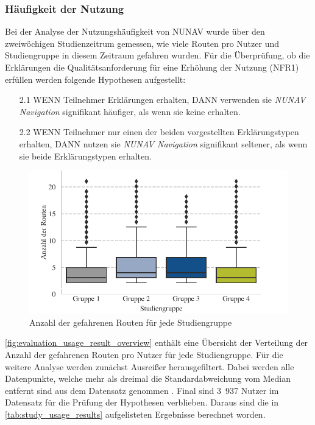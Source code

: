 \subsubsection{Häufigkeit der Nutzung}
\label{sec:06_model_evaluation:usage_analysis}

Bei der Analyse der Nutzungshäufigkeit von NUNAV wurde über den zweiwöchigen Studienzeitrum gemessen, wie viele Routen pro Nutzer und Studiengruppe in diesem Zeitraum gefahren wurden. Für die Überprüfung, ob die Erklärungen die Qualitätsanforderung für eine Erhöhung der Nutzung (NFR1) erfüllen werden folgende Hypothesen aufgestellt:

\begin{enumerate}
    \item[2.1] WENN Teilnehmer Erklärungen erhalten, DANN verwenden sie \textit{NUNAV Navigation} signifikant häufiger, als wenn sie keine erhalten.
    \item[2.2] WENN Teilnehmer nur einen der beiden vorgestellten Erklärungstypen erhalten, DANN nutzen sie \textit{NUNAV Navigation} signifikant seltener, als wenn sie beide Erklärungstypen erhalten.
\end{enumerate}

\begin{figure}[b!]
    \centering
    \includegraphics[width=\textwidth]{contents/06_model_evaluation/02_evaluation/res/usage_result_overview.pdf}
    \caption{Anzahl der gefahrenen Routen für jede Studiengruppe}
    \label{fig:evaluation_usage_result_overview}
\end{figure}

\autoref{fig:evaluation_usage_result_overview} enthält eine Übersicht der Verteilung der Anzahl der gefahrenen Routen pro Nutzer für jede Studiengruppe. Für die weitere Analyse werden zunächst Ausreißer herausgefiltert. Dabei werden alle Datenpunkte, welche mehr als dreimal die Standardabweichung vom Median entfernt sind aus dem Datensatz genommen \cite{leyes2013detecting}. Final sind 3~937 Nutzer im Datensatz für die Prüfung der Hypothesen verblieben. Daraus sind die in \autoref{tab:study_usage_results} aufgelisteten Ergebnisse berechnet worden.

